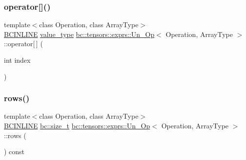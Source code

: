 \mbox{\label{structbc_1_1tensors_1_1exprs_1_1Un__Op_a684b195d190de12ca47d69a03c03a4c1}} 
\subsubsection{\texorpdfstring{operator[]()}{operator[]()}\hspace{0.1cm}{\footnotesize\ttfamily [2/2]}}
{\footnotesize\ttfamily template$<$class Operation, class Array\+Type$>$ \\
\hyperlink{common_8h_a6699e8b0449da5c0fafb878e59c1d4b1}{B\+C\+I\+N\+L\+I\+NE} \hyperlink{structbc_1_1tensors_1_1exprs_1_1Un__Op_a8c87b36ec972937cd789e6517fb47369}{value\+\_\+type} \hyperlink{structbc_1_1tensors_1_1exprs_1_1Un__Op}{bc\+::tensors\+::exprs\+::\+Un\+\_\+\+Op}$<$ Operation, Array\+Type $>$\+::operator\mbox{[}$\,$\mbox{]} (\begin{DoxyParamCaption}\item[{int}]{index }\end{DoxyParamCaption})\hspace{0.3cm}{\ttfamily [inline]}}

\mbox{\label{structbc_1_1tensors_1_1exprs_1_1Un__Op_ac95890e4e3df7d32d197d29719d9b2a6}} 
\subsubsection{\texorpdfstring{rows()}{rows()}}
{\footnotesize\ttfamily template$<$class Operation, class Array\+Type$>$ \\
\hyperlink{common_8h_a6699e8b0449da5c0fafb878e59c1d4b1}{B\+C\+I\+N\+L\+I\+NE} \hyperlink{namespacebc_aaf8e3fbf99b04b1b57c4f80c6f55d3c5}{bc\+::size\+\_\+t} \hyperlink{structbc_1_1tensors_1_1exprs_1_1Un__Op}{bc\+::tensors\+::exprs\+::\+Un\+\_\+\+Op}$<$ Operation, Array\+Type $>$\+::rows (\begin{DoxyParamCaption}{ }\end{DoxyParamCaption}) const\hspace{0.3cm}{\ttfamily [inline]}}

